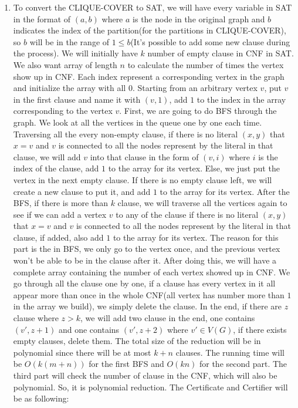 \documentclass[11pt]{article}
\begin{document}
\begin{solution}
$$ $$
\begin{enumerate}
    \item 
        To convert the CLIQUE-COVER to SAT, we will have every variable in SAT in the format of $(a,b)$ where $a$ is the node in the original graph and $b$ indicates the index of the partition(for the partitions in CLIQUE-COVER), so $b$ will be in the range of $1\leq b $(It's possible to add some new clause during the process). We will initially have $k$ number of empty clause in CNF in SAT. We also want array of length $n$ to calculate the number of times the vertex show up in CNF. Each index represent a corresponding vertex in the graph and initialize the array with all $0$. Starting from an arbitrary vertex $v$, put $v$ in the first clause and name it with $(v,1)$, add $1$ to the index in the array corresponding to the vertex $v$. First, we are going to do BFS through the graph. We look at all the vertices in the queue one by one each time. Traversing all the every non-empty clause, if there is no literal $(x,y)$ that $x=v$ and $v$ is connected to all the nodes represent by the literal in that clause, we will add $v$ into that clause in the form of $(v,i)$ where $i$ is the index of the clause, add $1$ to the array for its vertex. Else, we just put the vertex in the next empty clause. If there is no empty clause left, we will create a new clause to put it, and add $1$ to the array for its vertex. 
        \newline
        \newline
        After the BFS, if there is more than $k$ clause, we will traverse all the vertices again to see if we can add a vertex $v$ to any of the clause if there is no literal $(x,y)$ that $x=v$ and $v$ is connected to all the nodes represent by the literal in that clause, if added, also add $1$ to the array for its vertex. The reason for this part is the in BFS, we only go to the vertex once, and the previous vertex won't be able to be in the clause after it. After doing this, we will have a complete array containing the number of each vertex showed up in CNF. We go through all the clause one by one, if a clause has every vertex in it all appear more than once in the whole CNF(all vertex has number more than $1$ in the array we build), we simply delete the clause. 
        \newline
        \newline
        In the end, if there are $z$ clause where $z>k$, we will add two clause in the end, one contains $(v',z+1)$ and one contains $(v',z+2)$ where $v' \in V(G)$, if there exists empty clauses, delete them. The total size of the reduction will be in polynomial since there will be at most $k+n$ clauses. The running time will be $O(k(m+n))$ for the first BFS and $O(kn)$ for the second part. The third part will check the number of clause in the CNF, which will also be polynomial. So, it is polynomial reduction. The Certificate and Certifier will be as following:\begin{itemize}

\end{itemize}
\end{enumerate}
\end{solution}
\end{document}
